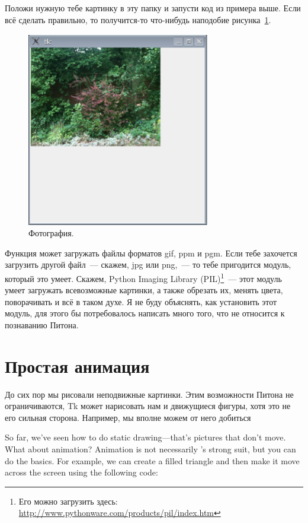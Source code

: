 Положи нужную тебе картинку в эту папку и запусти код из примера выше. Если всё сделать правильно, то получится-то что-нибудь наподобие рисунка \ref{fig43}.

\begin{figure}
\begin{center}
\includegraphics[width=80mm]{../en/figure43.eps}
\end{center}
\caption{Фотография.}\label{fig43}
\end{figure}

Функция  может загружать файлы форматов gif, ppm и pgm. Если тебе захочется загрузить другой файл — скажем, jpg или png, — то тебе пригодится модуль, который это умеет. Скажем, Python Imaging Library (PIL)\footnote{Его можно загрузить здесь: \url{http://www.pythonware.com/products/pil/index.htm}} — этот модуль  умеет загружать всевозможные картинки, а также обрезать их, менять цвета, поворачивать и всё в таком духе. Я не буду объяснять, как установить этот модуль, для этого бы потребовалось написать много того, что не относится к познаванию Питона.

\section{Простая анимация}

До сих пор мы рисовали неподвижные картинки. Этим возможности Питона не ограничиваются, Tk может нарисовать нам и движущиеся фигуры, хотя это не его сильная сторона. Например, мы вполне можем от него добиться 

So far, we've seen how to do static drawing---that's pictures that don't move. What about animation? Animation is not necessarily 's strong suit, but you can do the basics. For example, we can create a filled triangle and then make it move across the screen using the following code:

